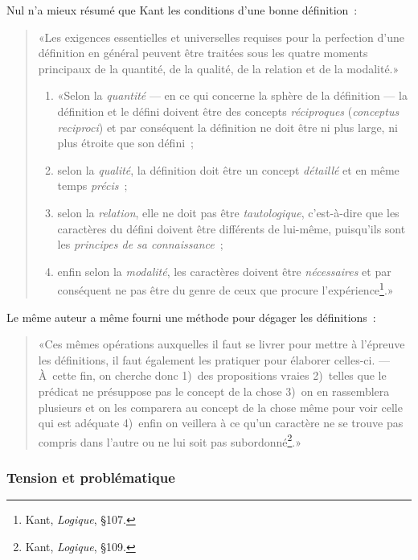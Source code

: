 \documentclass[a4paper,11pt]{article}
\newcommand{\cad}{c'est-à-dire}
\begin{document}
\par

Nul n'a mieux résumé que Kant les conditions d'une bonne définition~:
\begin{quote}
  «Les exigences essentielles et universelles requises pour la
  perfection d'une définition en général peuvent être traitées sous les
  quatre moments principaux de la quantité, de la qualité, de la
  relation et de la modalité.»

  \begin{enumerate}
  \item «Selon la \emph{quantité} --- en ce qui concerne la sphère de la
    définition --- la définition et le défini doivent être des concepts
    \emph{réciproques} (\emph{conceptus reciproci}) et par conséquent la
    définition ne doit être ni plus large, ni plus étroite que son défini~;
  \item selon la \emph{qualité}, la définition doit être un concept
    \emph{détaillé} et en même temps \emph{précis}~;
  \item selon la \emph{relation}, elle ne doit pas être
    \emph{tautologique}, \cad{} que les caractères du défini doivent
    être différents de lui-même, puisqu'ils sont les \emph{principes de
      sa connaissance}~;
  \item enfin selon la \emph{modalité}, les caractères doivent être
    \emph{nécessaires} et par conséquent ne pas être du genre de ceux
    que procure l'expérience\footnote{Kant, \emph{Logique}, §107.}.»
  \end{enumerate}
\end{quote}
Le même auteur a même fourni une méthode pour dégager les définitions~: 
\begin{quote}
  «Ces mêmes opérations auxquelles il faut se livrer pour mettre à
  l'épreuve les définitions, il faut également les pratiquer pour
  élaborer celles-ci. --- À~cette fin, on cherche donc 1)~des
  propositions vraies 2)~telles que le prédicat ne présuppose pas le
  concept de la chose 3)~on en rassemblera plusieurs et on les comparera
  au concept de la chose même pour voir celle qui est adéquate 4)~enfin
  on veillera à ce qu'un caractère ne se trouve pas compris dans l'autre
  ou ne lui soit pas subordonné\footnote{Kant, \emph{Logique}, §109.}.»
\end{quote}



\subsubsection{Tension et problématique}
\end{document}
